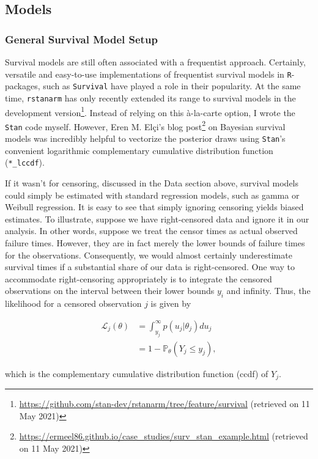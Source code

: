\documentclass[11pt]{article}
\begin{document}
\subsection{Models}
\subsubsection{General Survival Model Setup}
Survival models are still often associated with a frequentist approach. Certainly, versatile and easy-to-use implementations of frequentist survival models in \texttt{R}-packages, such as \texttt{Survival} \parencite{Rsurvival2020} have played a role in their popularity. At the same time, \texttt{rstanarm} \parencite{rstanarm2020} has only recently extended its range to survival models in the development version\footnote{\url{https://github.com/stan-dev/rstanarm/tree/feature/survival} (retrieved on 11 May 2021)}. Instead of relying on this à-la-carte option, I wrote the \texttt{Stan} code myself. However, Eren M. Elçi's blog post\footnote{\url{https://ermeel86.github.io/case_studies/surv_stan_example.html} (retrieved on 11 May 2021)} on Bayesian survival models was incredibly helpful to vectorize the posterior draws using \texttt{Stan}'s convenient logarithmic complementary cumulative distribution function (\texttt{*\_lccdf}).

If it wasn't for censoring, discussed in the Data section above, survival models could simply be estimated with standard regression models, such as gamma or Weibull regression. It is easy to see that simply ignoring censoring yields biased estimates. To illustrate, suppose we have right-censored data and ignore it in our analysis. In other words, suppose we treat the censor times as actual observed failure times. However, they are in fact merely the lower bounds of failure times for the observations. Consequently, we would almost certainly underestimate survival times if a substantial share of our data is right-censored. One way to accommodate right-censoring appropriately is to integrate the censored observations on the interval between their lower bounds $y_i$ and infinity. Thus, the likelihood for a censored observation $j$ is given by 

\begin{align*}
\mathcal{L}_j (\theta) &= \int_{y_j}^{\infty} p(u_j|\theta_j) du_j \\
&= 1-\mathbb{P}_\theta(Y_j \leq y_j),
\end{align*}

which is the complementary cumulative distribution function (ccdf) of $Y_j$.
\end{document}

